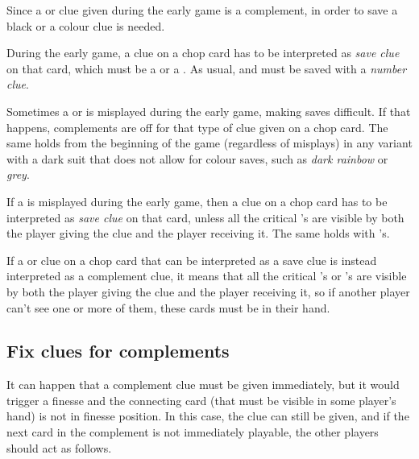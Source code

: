 Since a  or  clue given during the early game is a complement, in order to save a black  or  a colour clue is needed.

\begin{convention}
	During the early game, a  clue on a chop card has to be interpreted as \emph{save clue} on that card, which must be a  or a . As usual,  and  must be saved with a \emph{number clue}.
\end{convention}

Sometimes a  or  is misplayed during the early game, making saves difficult. If that happens, complements are off for that type of clue given on a chop card. The same holds from the beginning of the game (regardless of misplays) in any variant with a dark suit that does not allow for colour saves, such as \emph{dark rainbow} or \emph{grey}.

\begin{convention}
	If a  is misplayed during the early game, then a  clue on a chop card has to be interpreted as \emph{save clue} on that card, unless all the critical 's are visible by both the player giving the clue and the player receiving it. The same holds with 's.
\end{convention}

\begin{corollary}
	If a  or  clue on a chop card that can be interpreted as a save clue is instead interpreted as a complement clue, it means that all the critical 's or 's are visible by both the player giving the clue and the player receiving it, so if another player can't see one or more of them, these cards must be in their hand.
\end{corollary}

\subsection{Fix clues for complements}

It can happen that a complement clue must be given immediately, but it would trigger a finesse and the connecting card (that must be visible in some player's hand) is not in finesse position. In this case, the clue can still be given, and if the next card in the complement is not immediately playable, the other players should act as follows.

